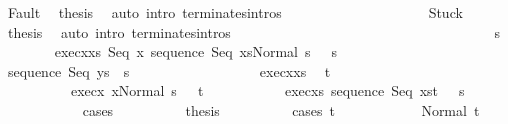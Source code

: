 \begin{isabellebody}
\ Fault\ \isamarkupfalse%
\ {\isacharquery}thesis\ \isamarkupfalse%
\ {\isacharparenleft}auto\ intro{\isacharcolon}\ terminates{\isachardot}intros{\isacharparenright}\isanewline
\ \ \ \ \ \ \ \ \isamarkupfalse%
\isanewline
\ \ \ \ \ \ \ \ \ \ \isamarkupfalse%
\ Stuck\ \isamarkupfalse%
\ {\isacharquery}thesis\ \isamarkupfalse%
\ {\isacharparenleft}auto\ intro{\isacharcolon}\ terminates{\isachardot}intros{\isacharparenright}\isanewline
\ \ \ \ \ \ \ \ \isamarkupfalse%
\isanewline
\ \ \ \ \ \ \isamarkupfalse%
\isanewline
\ \ \ \ \isamarkupfalse%
\isanewline
\ \ \ \ \isamarkupfalse%
\isanewline
\ \ \ \ \isacommand{{\isacharbraceleft}}\isamarkupfalse%
\isanewline
\ \ \ \ \ \ \isamarkupfalse%
\ s{\isacharprime}\isanewline
\ \ \ \ \ \ \isamarkupfalse%
\ exec{\isacharunderscore}x{\isacharunderscore}xs{\isacharcolon}\ {\isachardoublequoteopen}{\isasymGamma}{\isasymturnstile}{\isasymlangle}Seq\ x\ {\isacharparenleft}sequence\ Seq\ xs{\isacharparenright}{\isacharcomma}Normal\ s\ {\isasymrangle}\ {\isasymRightarrow}\ s{\isacharprime}{\isachardoublequoteclose}\isanewline
\ \ \ \ \ \ \isamarkupfalse%
\ {\isachardoublequoteopen}{\isasymGamma}{\isasymturnstile}sequence\ Seq\ ys\ {\isasymdown}\ s{\isacharprime}{\isachardoublequoteclose}\isanewline
\ \ \ \ \ \ \isamarkupfalse%
\ {\isacharminus}\isanewline
\ \ \ \ \ \ \ \ \isamarkupfalse%
\ exec{\isacharunderscore}x{\isacharunderscore}xs\ \isamarkupfalse%
\ t\ \ \isanewline
\ \ \ \ \ \ \ \ \ \ exec{\isacharunderscore}x{\isacharcolon}\ {\isachardoublequoteopen}{\isasymGamma}{\isasymturnstile}{\isasymlangle}x{\isacharcomma}Normal\ s\ {\isasymrangle}\ {\isasymRightarrow}\ t{\isachardoublequoteclose}\ \isanewline
\ \ \ \ \ \ \ \ \ \ exec{\isacharunderscore}xs{\isacharcolon}\ {\isachardoublequoteopen}{\isasymGamma}{\isasymturnstile}{\isasymlangle}sequence\ Seq\ xs{\isacharcomma}t\ {\isasymrangle}\ {\isasymRightarrow}\ s{\isacharprime}{\isachardoublequoteclose}\isanewline
\ \ \ \ \ \ \ \ \ \ \isamarkupfalse%
\ cases\isanewline
\ \ \ \ \ \ \ \ \isamarkupfalse%
\ {\isacharquery}thesis\isanewline
\ \ \ \ \ \ \ \ \isamarkupfalse%
\ {\isacharparenleft}cases\ t{\isacharparenright}\isanewline
\ \ \ \ \ \ \ \ \ \ \isamarkupfalse%
\ {\isacharparenleft}Normal\ t{\isacharprime}{\isacharparenright}\isanewline

\end{isabellebody}
